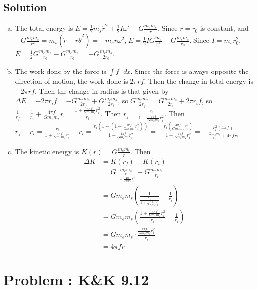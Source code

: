\documentclass[solutions]{esg8012pset}
\begin{document}
\subsection{Solution}
\begin{enumerate}[(a)]
  \item The total energy is $E = \frac12 m_s \dot r^2 + \frac12 I\omega^2 - G\frac{m_e m_s}{r}$.  Since $r = r_0$ is constant, and $-G \frac{m_e m_s}{r^2} = m_s (\ddot r - r\dot\theta^2) = - m_s r \omega^2$, $E = \frac12 I G \frac{m_e}{r_0^3} - G\frac{m_e m_s}{r_0}$.   Since $I = m_s r_0^2$, $E = \frac12 G \frac{m_e m_s}{r_0} - G\frac{m_e m_s}{r_0} = -G\frac{m_e m_s}{2r_0}$.
  \item The work done by the force is $\int f \cdot d x$.  Since the force is always opposite the direction of motion, the work done is $2\pi r f$.  Then the change in total energy is $-2\pi r f$.  Then the change in radius is that given by $\Delta E = -2\pi r_i f = -G\frac{m_e m_s}{2r_f} + G\frac{m_e m_s}{2r_i}$, so $G\frac{m_e m_s}{2r_f} = G\frac{m_e m_s}{2r_i} + 2\pi r_i f$, so $\frac{1}{r_f} = \frac{1}{r_i} + \frac{4\pi f}{G m_e m_s} r_i = \frac{1 + \frac{4\pi f}{G m_e m_s} r_i^2}{r_i}$.  Then $r_f = \frac{r_i}{1 + \frac{4\pi f}{G m_e m_s} r_i^2}$.  Then $r_f - r_i = \frac{r_i}{1 + \frac{4\pi f}{G m_e m_s} r_i^2} - r_i = \frac{r_i\left(1-\left(1 + \frac{4\pi f}{G m_e m_s} r_i^2\right)\right)}{1 + \frac{4\pi f}{G m_e m_s} r_i^2} = -\frac{r_i\left(\frac{4\pi f}{G m_e m_s} r_i^2\right)}{1 + \frac{4\pi f}{G m_e m_s} r_i^2} = -\frac{r_i^2(4\pi f)}{\frac{G m_e m_s}{r_i} + 4\pi f r_i}$
  \item The kinetic energy is $K(r) = G \frac{m_e m_s}{r}$.  Then \begin{align*}
 \Delta K & = K(r_f) - K(r_i) \\
  & = G \frac{m_e m_s}{\frac{r_i}{1 + \frac{4\pi f}{G m_e m_s} r_i^2}} - G \frac{m_e m_s}{r_i} \\
  & = G m_e m_s \left( \frac{1}{\frac{r_i}{1 + \frac{4\pi f}{G m_e m_s} r_i^2}} - \frac{1}{r_i}\right) \\
  & = G m_e m_s \left( \frac{1 + \frac{4\pi f}{G m_e m_s} r_i^2}{r_i} - \frac{1}{r_i}\right) \\
  & = G m_e m_s\cdot \frac{\frac{4\pi f}{G m_e m_s} r_i^2}{r_i} \\
  & = 4\pi f r
\end{align*}
\end{enumerate}
\section{Problem \thesection: K\&K 9.12}
\end{document}
